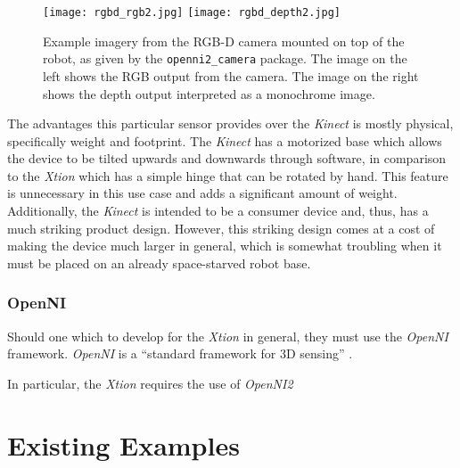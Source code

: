 \begin{figure}[!h]
    \centering
    \texttt{[image: rgbd\_rgb2.jpg]}
    \texttt{[image: rgbd\_depth2.jpg]}
    \caption{Example imagery from the RGB-D camera mounted on top of the robot, as given by the \texttt{openni2\_camera} package. The image on the left shows the RGB output from the camera. The image on the right shows the depth output interpreted as a monochrome image.}
    \label{fig:rgbd_images1}
\end{figure}

The advantages this particular sensor provides over the \emph{Kinect} is mostly physical, specifically weight and footprint. The \emph{Kinect} has a motorized base which allows the device to be tilted upwards and downwards through software, in comparison to the \emph{Xtion} which has a simple hinge that can be rotated by hand. This feature is unnecessary in this use case and adds a significant amount of weight. Additionally, the \emph{Kinect} is intended to be a consumer device and, thus, has a much striking product design. However, this striking design comes at a cost of making the device much larger in general, which is somewhat troubling when it must be placed on an already space-starved robot base.

\subsubsection{OpenNI}
Should one which to develop for the \emph{Xtion} in general, they must use the \emph{OpenNI} framework. \emph{OpenNI} is a ``standard framework for 3D sensing'' \cite{openni_site}.

In particular, the \emph{Xtion} requires the use of \emph{OpenNI2}


\section{Existing Examples}
